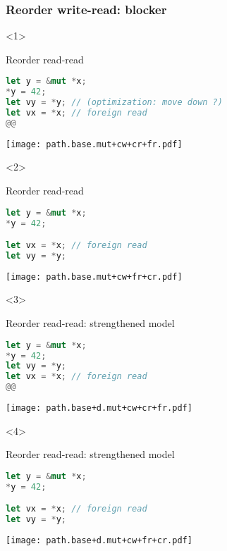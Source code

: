 \begin{frame}[fragile, t]
    \frametitle{Reorder write-read: blocker}
    \begin{onlyenv}<1>
        \begin{block}{{\cmark} Reorder read-read\vphantom{gh}}
            \begin{lstlisting}[language=rust, escapechar=@]
let y = &mut *x;
*y = 42;
let vy = *y; // (optimization: move down ?)
let vx = *x; // foreign read
@@
            \end{lstlisting}
        \end{block}
        \texttt{[image: path.base.mut+cw+cr+fr.pdf]}
    \end{onlyenv}

    \begin{onlyenv}<2>
        \begin{block}{{\cmark} Reorder read-read\vphantom{gh}}
            \begin{lstlisting}[language=rust]
let y = &mut *x;
*y = 42;

let vx = *x; // foreign read
let vy = *y;
            \end{lstlisting}
        \end{block}
        \texttt{[image: path.base.mut+cw+fr+cr.pdf]}
    \end{onlyenv}

    \begin{onlyenv}<3>
        \begin{block}{{\xmark} Reorder read-read: strengthened model}
            \begin{lstlisting}[language=rust, escapechar=@]
let y = &mut *x;
*y = 42;
let vy = *y;
let vx = *x; // foreign read
@@
            \end{lstlisting}
        \end{block}
        \texttt{[image: path.base+d.mut+cw+cr+fr.pdf]}
    \end{onlyenv}

    \begin{onlyenv}<4>
        \begin{block}{{\xmark} Reorder read-read: strengthened model}
            \begin{lstlisting}[language=rust]
let y = &mut *x;
*y = 42;

let vx = *x; // foreign read
let vy = *y;
            \end{lstlisting}
        \end{block}
        \texttt{[image: path.base+d.mut+cw+fr+cr.pdf]}
    \end{onlyenv}
\end{frame}

